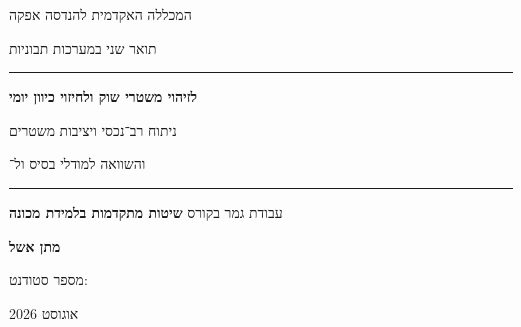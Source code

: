 \documentclass[12pt,a4paper]{article}
\begin{document}
\begin{titlepage}
\thispagestyle{empty}
\begin{center}
\vspace*{0.9cm}
{\sffamily\Large\color{mutedgray} המכללה האקדמית להנדסה אפקה \par}
\vspace{0.22cm}
{\sffamily\large\color{mutedgray} תואר שני במערכות תבוניות \par}

\vspace{1.45cm}
{\color{linegray}\rule{0.82\textwidth}{0.8pt}}\par
\vspace{0.85cm}
{\sffamily\Huge\bfseries\color{academicblue}  \par}
\vspace{0.18cm}
{\sffamily\huge\bfseries\color{academicblue} לזיהוי משטרי שוק ולחיזוי כיוון יומי \par}
\vspace{0.75cm}
{\sffamily\Large\color{deepnavy} ניתוח רב־נכסי ויציבות משטרים \par}
\vspace{0.18cm}
{\sffamily\Large\color{deepnavy} והשוואה למודלי בסיס ול־ \par}
\vspace{0.8cm}
{\color{linegray}\rule{0.82\textwidth}{0.8pt}}\par

\vspace{1.35cm}
{\sffamily\large עבודת גמר בקורס \textbf{שיטות מתקדמות בלמידת מכונה} \par}

\vfill
{\sffamily\Large\bfseries\color{deepnavy} מתן אשל \par}
\vspace{0.25cm}
{\sffamily\large מספר סטודנט:  \par}
\vspace{0.75cm}
{\sffamily\large\color{mutedgray} אוגוסט 2026 \par}
\vspace{0.75cm}
\end{center}
\end{titlepage}


\clearpage
\begingroup
\small
\setlength{\parskip}{0pt}
\tableofcontents
\endgroup
\thispagestyle{plain}
\clearpage
{}












\clearpage
\begingroup
\small
\begin{english}
\renewcommand{\refname}{\makebox[\textwidth][r]{\texthebrew{מקורות}}}


\end{english}
\endgroup
\end{document}
